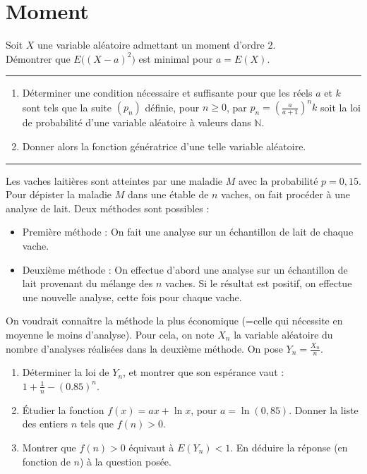 \documentclass[../PolyS4.tex]{subfiles}
\begin{document}
\newpage

\section{Moment}


Soit $X$ une variable aléatoire admettant un moment d'ordre 2.\\ Démontrer que $E\big((X-a)^2\big)$ est minimal pour $a=E(X)$.\\

\hfill\break
\hrule
\hfill\break




\begin{enumerate}
\item Déterminer une condition nécessaire et suffisante pour que les réels $a$ et $k$ sont tels que la suite $(p_n)$ définie, pour $n\geq 0$, par $p_n=\left(\frac a{a+1}\right)^n k$ soit la loi de probabilité d'une variable aléatoire à valeurs dans $\mathbb N$. 
\item Donner alors la fonction génératrice d'une telle variable aléatoire.\\
\end{enumerate}

\hfill\break
\hrule
\hfill\break


Les vaches laitières sont atteintes par une maladie $M$ avec la probabilité $p=0,15$. Pour dépister la maladie $M$ dans une étable de $n$ vaches, on fait procéder à une analyse de lait. Deux méthodes sont possibles :
\begin{itemize}
\item Première méthode : On fait une analyse sur un échantillon de lait de chaque vache.
\item Deuxième méthode : On effectue d'abord une analyse sur un échantillon de lait provenant du mélange des $n$ vaches. Si le résultat est positif, on effectue une nouvelle analyse, cette fois pour chaque vache.
\end{itemize}
On voudrait connaître la méthode la plus économique (=celle qui nécessite en moyenne le moins d'analyse). Pour cela, on note $X_n$ la variable aléatoire du nombre 
d'analyses réalisées dans la deuxième méthode. On pose $Y_n=\frac{X_n}{n}.$
\begin{enumerate}
\item Déterminer la loi de $Y_n$, et montrer que son espérance vaut : $1+\frac{1}{n}-(0.85)^n$.
\item \' Etudier la fonction $f(x)=ax+\ln x$, pour $a=\ln(0,85)$. Donner la liste des entiers $n$ tels que $f(n)>0$.
\item Montrer que $f(n)>0$ équivaut à $E(Y_n)<1$. En déduire la réponse (en fonction de $n$) à la question posée.\\
\end{enumerate}
\end{document}
